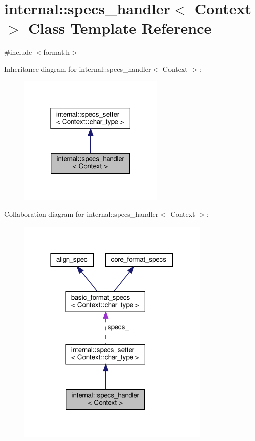 \hypertarget{classinternal_1_1specs__handler}{}\section{internal\+:\+:specs\+\_\+handler$<$ Context $>$ Class Template Reference}
\label{classinternal_1_1specs__handler}


{\ttfamily \#include $<$format.\+h$>$}



Inheritance diagram for internal\+:\+:specs\+\_\+handler$<$ Context $>$\+:
\nopagebreak
\begin{figure}[H]
\begin{center}
\leavevmode
\includegraphics[width=198pt]{classinternal_1_1specs__handler__inherit__graph}
\end{center}
\end{figure}


Collaboration diagram for internal\+:\+:specs\+\_\+handler$<$ Context $>$\+:
\nopagebreak
\begin{figure}[H]
\begin{center}
\leavevmode
\includegraphics[width=262pt]{classinternal_1_1specs__handler__coll__graph}
\end{center}
\end{figure}
